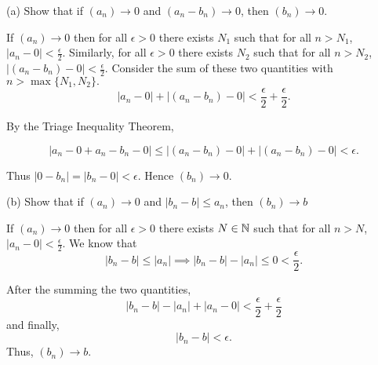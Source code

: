 \documentclass{report}
\begin{document}
(a) Show that if $\left(a_n\right) \rightarrow 0$ and $\left(a_n-b_n\right) \rightarrow 0$, then $\left(b_n\right) \rightarrow 0$.
\begin{myproof}
    
  If $\left(a_n\right) \rightarrow 0$ then for all $\epsilon >0$ there exists $N_1$ such that for all $n> N_1$, $|a_n - 0| < \frac{\epsilon}{2}.$ Similarly, for all $\epsilon >0$ there exists $N_2$ such that for all $n > N_2$, $| (a_n - b_n) - 0 |< \frac{\epsilon}{2}.$ Consider the sum of these two quantities with $n > \max\{N_1,N_2\}.$
$$| a_n  - 0 |+ | (a_n - b_n) - 0 |<  \frac{\epsilon}{2} + \frac{\epsilon}{2}.$$

By the Triage Inequality Theorem, 

$$| a_n - 0  + a_n - b_n - 0 | \leq | (a_n - b_n) - 0 |+ | (a_n - b_n) - 0 |< \epsilon.$$

Thus $|0 - b_n| = |b_n - 0 |< \epsilon.$ Hence $(b_n) \rightarrow 0.$

\end{myproof}


\bigskip
(b) Show that if $\left(a_n\right) \rightarrow 0$ and $\left|b_n-b\right| \leq a_n$, then $\left(b_n\right) \rightarrow b$

\begin{myproof}
    
  If $(a_n) \rightarrow 0 $ then for all $\epsilon > 0 $ there exists
$N \in \NN$ such that for all $n > N$, $|a_n - 0| < \frac{\epsilon}{2}.$ We know that $$|b_n - b| \leq |a_n|  \implies |b_n - b| - |a_n|\leq 0 < \frac{\epsilon}{2}.$$

After the summing the two quantities,
 $$|b_n - b| - |a_n| + |a_n -0| < \frac{\epsilon}{2} + \frac{\epsilon}{2}$$
 and finally,
 $$|b_n - b|  < \epsilon.$$ Thus, $(b_n) \rightarrow b.$

\end{myproof}

\end{document}
